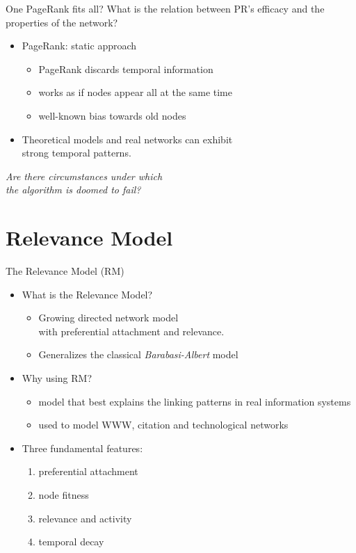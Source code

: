 \documentclass[utf8, compress]{beamer}
\begin{document}
\begin{frame}{One PageRank fits all?}
    What is the relation between PR's efficacy and the properties of the network?
    \begin{itemize}
        \item PageRank: \alert{static} approach
        \begin{itemize}
            \item PageRank discards temporal information
            \item works as if nodes appear all at the same time
            \item well-known bias towards old nodes
        \end{itemize}
        \item Theoretical models and real networks can exhibit \\ \alert{strong temporal patterns}.
    \end{itemize}
    \begin{center}
        \emph{Are there circumstances under which \\ the algorithm is doomed to fail?}
    \end{center}
\end{frame}

\section{Relevance Model}
\begin{frame}{The Relevance Model (RM)}
    \begin{itemize}
        \item What is the Relevance Model?
        \begin{itemize}
            \item Growing directed network model \\ with \alert{preferential attachment} and \alert{relevance}.
            \item Generalizes the classical \emph{Barabasi-Albert} model
        \end{itemize}

        \item Why using RM?
        \begin{itemize}
            \item model that best explains the linking patterns in real information systems
            \item used to model WWW, citation and technological networks
        \end{itemize}

        \item Three fundamental features:
        \begin{enumerate}
            \item preferential attachment
            \item node fitness
            \item relevance and activity
            \item temporal decay
        \end{enumerate}
    \end{itemize}
\end{frame}
\end{document}
